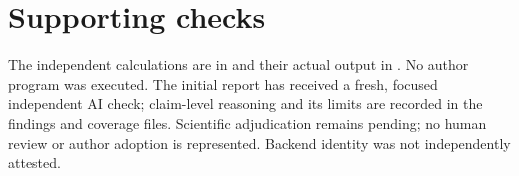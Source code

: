 \documentclass[10pt]{article}
\begin{document}
\section*{Supporting checks}
The independent calculations are in and their actual output in . No author program was executed. The initial report has received a fresh, focused independent AI check; claim-level reasoning and its limits are recorded in the findings and coverage files. Scientific adjudication remains pending; no human review or author adoption is represented. Backend identity was not independently attested.\par
\end{document}

